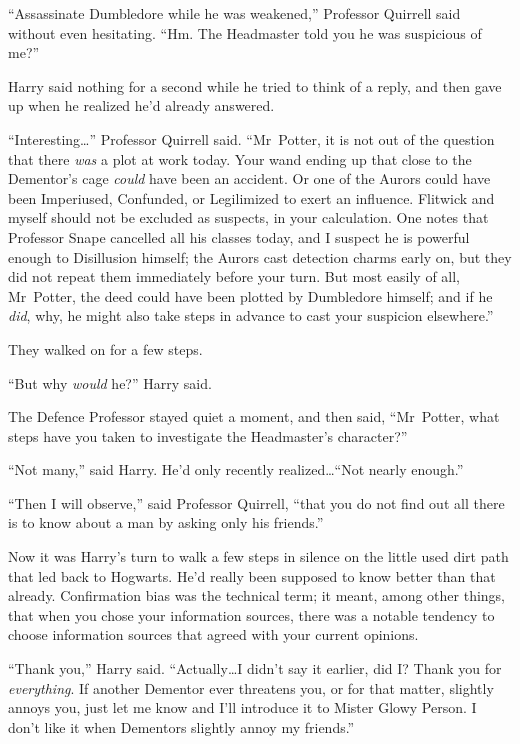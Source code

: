 “Assassinate Dumbledore while he was weakened,” Professor Quirrell said without even hesitating.
“Hm. The Headmaster told you he was suspicious of me?”

Harry said nothing for a second while he tried to think of a reply, and then gave up when he realized he’d already answered.

“Interesting…” Professor Quirrell said.
“Mr~Potter, it is not out of the question that there \emph{was} a plot at work today. Your wand ending up that close to the Dementor’s cage \emph{could} have been an accident. Or one of the Aurors could have been Imperiused, Confunded, or Legilimized to exert an influence. Flitwick and myself should not be excluded as suspects, in your calculation. One notes that Professor Snape cancelled all his classes today, and I suspect he is powerful enough to Disillusion himself; the Aurors cast detection charms early on, but they did not repeat them immediately before your turn. But most easily of all, Mr~Potter, the deed could have been plotted by Dumbledore himself; and if he \emph{did}, why, he might also take steps in advance to cast your suspicion elsewhere.”

They walked on for a few steps.

“But why \emph{would} he?” Harry said.

The Defence Professor stayed quiet a moment, and then said,
“Mr~Potter, what steps have you taken to investigate the Headmaster’s character?”

“Not many,” said Harry. He’d only recently realized…“Not nearly enough.”

“Then I will observe,” said Professor Quirrell, “that you do not find out all there is to know about a man by asking only his friends.”

Now it was Harry’s turn to walk a few steps in silence on the little used dirt path that led back to Hogwarts. He’d really been supposed to know better than that already. Confirmation bias was the technical term; it meant, among other things, that when you chose your information sources, there was a notable tendency to choose information sources that agreed with your current opinions.

“Thank you,” Harry said.
“Actually…I didn’t say it earlier, did I? Thank you for \emph{everything}. If another Dementor ever threatens you, or for that matter, slightly annoys you, just let me know and I’ll introduce it to Mister Glowy Person. I don’t like it when Dementors slightly annoy my friends.”

